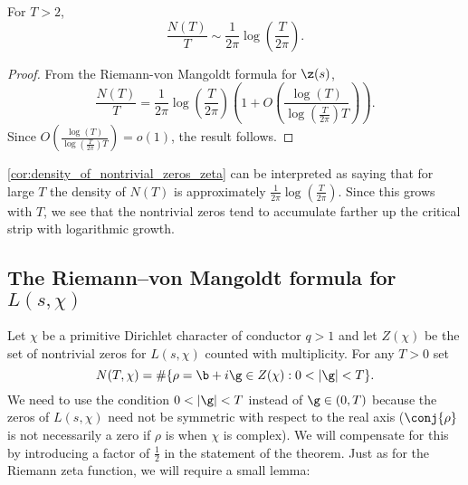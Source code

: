       \begin{corollary}\label{cor:density_of_nontrivial_zeros_zeta}
        For $T > 2$,
        \[
          \frac{N(T)}{T} \sim \frac{1}{2\pi}\log\left(\frac{T}{2\pi}\right).
        \]
      \end{corollary}
      \begin{proof}
        From the Riemann-von Mangoldt formula for $\z(s)$,
        \[
          \frac{N(T)}{T} = \frac{1}{2\pi}\log\left(\frac{T}{2\pi}\right)\left(1+O\left(\frac{\log(T)}{\log\left(\frac{T}{2\pi}\right)T}\right)\right).
        \]
        Since $O\left(\frac{\log(T)}{\log\left(\frac{T}{2\pi}\right)T}\right) = o(1)$, the result follows.
      \end{proof}

      \cref{cor:density_of_nontrivial_zeros_zeta} can be interpreted as saying that for large $T$ the density of $N(T)$ is approximately $\frac{1}{2\pi}\log\left(\frac{T}{2\pi}\right)$. Since this grows with $T$, we see that the nontrivial zeros tend to accumulate farther up the critical strip with logarithmic growth.
    \subsection*{The Riemann–von Mangoldt formula for $L(s,\chi)$}
      Let $\chi$ be a primitive Dirichlet character of conductor $q > 1$ and let $Z(\chi)$ be the set of nontrivial zeros for $L(s,\chi)$ counted with multiplicity. For any $T > 0$ set
      \[
        N(T,\chi) = \#\{\rho = \b+i\g \in Z(\chi):0 < |\g| < T\}.
      \]
      We need to use the condition $0 < |\g| < T$ instead of $\g \in (0,T)$ because the zeros of $L(s,\chi)$ need not be symmetric with respect to the real axis ($\conj{\rho}$ is not necessarily a zero if $\rho$ is when $\chi$ is complex). We will compensate for this by introducing a factor of $\frac{1}{2}$ in the statement of the theorem. Just as for the Riemann zeta function, we will require a small lemma:


